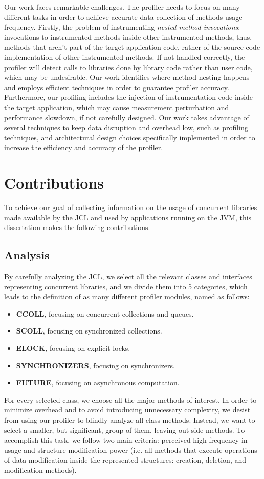 \documentclass[]{usiinfthesis}
\begin{document}
Our work faces remarkable challenges. The profiler needs to focus on many different tasks in order to achieve accurate data collection of methods usage frequency. Firstly, the problem of instrumenting \textit{nested method invocations}:  invocations to instrumented methods inside other instrumented methods, thus, methods that aren’t part of the target application code, rather of the source-code implementation of other instrumented methods. If not handled correctly, the profiler will detect calls to libraries done by library code rather than user code, which may be undesirable. Our work identifies where method nesting happens and employs efficient techniques in order to guarantee profiler accuracy. Furthermore, our profiling includes the injection of instrumentation code inside the target application, which may cause measurement perturbation and performance slowdown, if not carefully designed. Our work takes advantage of several techniques to keep data disruption and overhead low, such as profiling techniques, and architectural design choices specifically implemented in order to increase the efficiency and accuracy of the profiler.


\section{Contributions}
To achieve our goal of collecting information on the usage of concurrent libraries made available by the JCL and used by applications running on the JVM, this dissertation makes the following contributions.

\subsection{Analysis}
By carefully analyzing  the JCL, we select all the relevant classes and interfaces representing concurrent libraries, and we divide them into 5 categories, which leads to the definition of as many different profiler modules, named as follows:
\begin{itemize}
    \item \textbf{CCOLL}, focusing on concurrent collections and queues.
    \item \textbf{SCOLL}, focusing on synchronized collections.
    \item \textbf{ELOCK}, focusing on explicit locks.
    \item \textbf{SYNCHRONIZERS}, focusing on synchronizers.
    \item \textbf{FUTURE}, focusing on asynchronous computation.
\end{itemize}
For every selected class, we choose all the major methods of interest. In order to minimize overhead and to avoid introducing unnecessary complexity, we desist from using our profiler to blindly analyze all class methods. Instead, we want to select a smaller, but significant, group of them, leaving out side methods. To accomplish this task, we follow two main criteria: perceived high frequency in usage and structure modification power (i.e. all methods that execute operations of data modification inside the represented structures: creation, deletion, and modification methods).
\end{document}
